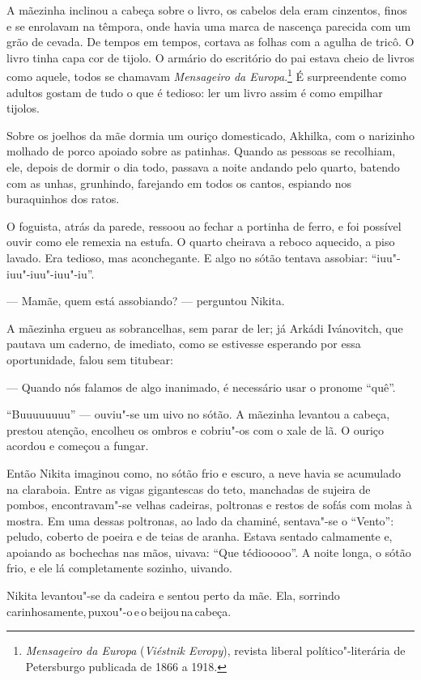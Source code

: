 A mãezinha inclinou a cabeça sobre o livro, os cabelos dela eram
cinzentos, finos e se enrolavam na têmpora, onde havia uma marca de
nascença parecida com um grão de cevada. De tempos em tempos, cortava
as folhas com a agulha de tricô. O livro tinha capa cor de tijolo. O
armário do escritório do pai estava cheio de livros como aquele, todos
se chamavam \emph{Mensageiro da Europa}.\footnote{\emph{Mensageiro da
  Europa} (\emph{Viéstnik Evropy}), revista liberal político"-literária
  de Petersburgo publicada de 1866 a 1918.} É surpreendente como adultos
gostam de tudo o que é tedioso: ler um livro assim é como empilhar
tijolos.

Sobre os joelhos da mãe dormia um ouriço domesticado, Akhilka, com o
narizinho molhado de porco apoiado sobre as patinhas. Quando as pessoas
se recolhiam, ele, depois de dormir o dia todo, passava a noite andando
pelo quarto, batendo com as unhas, grunhindo, farejando em todos os
cantos, espiando nos buraquinhos dos ratos.

O foguista, atrás da parede, ressoou ao fechar a portinha de ferro, e
foi possível ouvir como ele remexia na estufa. O quarto cheirava a
reboco aquecido, a piso lavado. Era tedioso, mas aconchegante. E algo no
sótão tentava assobiar: ``iuu"-iuu"-iuu"-iuu"-iu''.

--- Mamãe, quem está assobiando? --- perguntou Nikita.

A mãezinha ergueu as sobrancelhas, sem parar de ler; já Arkádi
Ivánovitch, que pautava um caderno, de imediato, como se estivesse
esperando por essa oportunidade, falou sem titubear:

--- Quando nós falamos de algo inanimado, é necessário usar o pronome
``quê''.

``Buuuuuuuu'' --- ouviu"-se um uivo no sótão. A mãezinha levantou a
cabeça, prestou atenção, encolheu os ombros e cobriu"-os com o xale de
lã. O ouriço acordou e começou a fungar.

Então Nikita imaginou como, no sótão frio e escuro, a neve havia se acumulado
na claraboia. Entre as vigas gigantescas do teto, manchadas de sujeira
de pombos, encontravam"-se velhas cadeiras, poltronas e restos de sofás
com molas à mostra. Em uma dessas poltronas, ao lado da chaminé,
sentava"-se o ``Vento'': peludo, coberto de poeira e de teias de aranha.
Estava sentado calmamente e, apoiando as bochechas nas mãos, uivava:
``Que tédiooooo''. A noite longa, o sótão frio, e ele lá completamente
sozinho, uivando.

Nikita levantou"-se da cadeira e sentou perto da mãe. Ela, sorrindo\,carinhosamente,\,puxou"-o\,e\,o\,beijou\,na\,cabeça.

